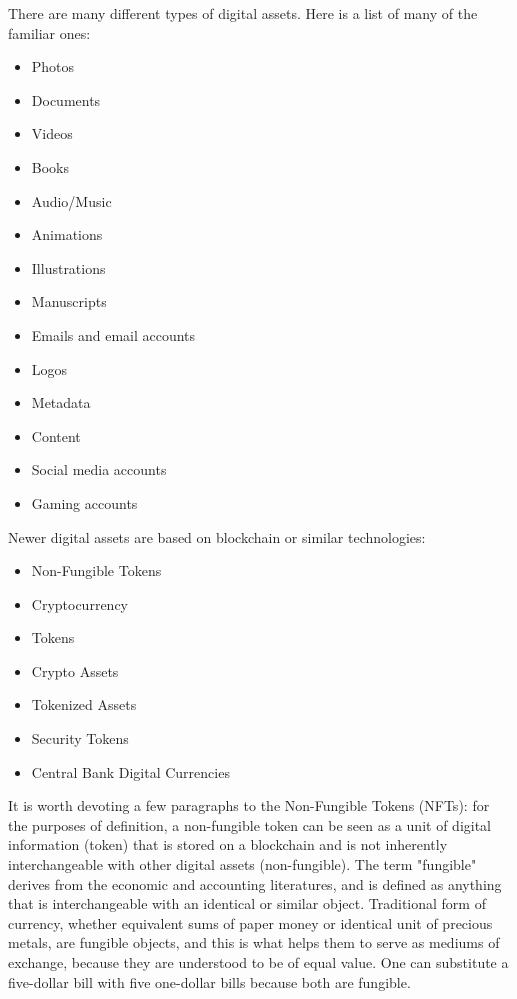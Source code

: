 \documentclass[MSE,Master,english]{twbook}%
\begin{document}
There are many different types of digital assets.\cite{digAssets} Here is a list of many of the familiar ones:
\begin{multicols}{2}
  \begin{itemize}
    \item Photos
    \item Documents
    \item Videos
    \item Books
    \item Audio/Music
    \item Animations
    \item Illustrations
    \item Manuscripts
    \item Emails and email accounts
    \item Logos
    \item Metadata
    \item Content
    \item Social media accounts
    \item Gaming accounts
  \end{itemize}
\end{multicols}

Newer digital assets are based on blockchain or similar technologies:
\begin{multicols}{2}
  \begin{itemize}
    \item Non-Fungible Tokens
    \item Cryptocurrency
    \item Tokens
    \item Crypto Assets
    \item Tokenized Assets
    \item Security Tokens
    \item Central Bank Digital Currencies
  \end{itemize}
\end{multicols}

It is worth devoting a few paragraphs to the Non-Fungible Tokens (\glspl{NFT}): for the purposes of definition, a non-fungible token\cite{nft} can be seen as a unit of digital information (token) that is stored on a blockchain and is not inherently interchangeable with other digital assets (non-fungible). The term "fungible" derives from the economic and accounting literatures, and is defined as anything that is interchangeable with an identical or similar object. Traditional form of currency, whether equivalent sums of paper money or identical unit of precious metals, are fungible objects, and this is what helps them to serve as mediums of exchange, because they are understood to be of equal value. One can substitute a five-dollar bill with five one-dollar bills because both are fungible.
\end{document}
